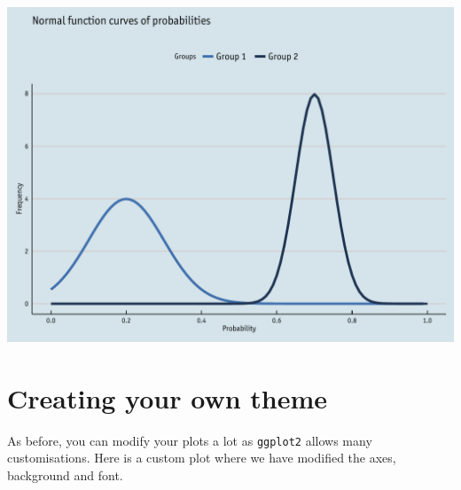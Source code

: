 \begin{Shaded}
\begin{Highlighting}[]
\StringTok{        }\NormalTok{(}\NormalTok{, } \NormalTok{),}
\StringTok{        } \NormalTok{(} \NormalTok{), }
\StringTok{        } \NormalTok{(), }
\StringTok{        } \NormalTok{(), } \NormalTok{(),}
\StringTok{        } \NormalTok{(} \NormalTok{),}
\StringTok{        }\NormalTok{(}\NormalTok{))}
\end{Highlighting}
\end{Shaded}

\begin{center}\includegraphics[width=0.55\linewidth]{figures/function_15-1} \end{center}

\section{Creating your own theme}\label{creating-your-own-theme-8}

As before, you can modify your plots a lot as \texttt{ggplot2} allows
many customisations. Here is a custom plot where we have modified the
axes, background and font.

